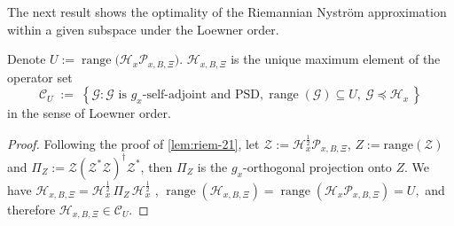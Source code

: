 \documentclass[final,onefignum,onetabnum]{siamart250211}
\begin{document}
    

The next result shows the optimality of the Riemannian Nystr\"om approximation within a given subspace under the Loewner order.
  \begin{proposition}
    \label{prop:nystrom-loewner-opt}
    Denote ${U}:=\operatorname{range}\!\big(\mathcal{H}_x\mathcal{P}_{x, B, \Xi}\big)$. $\mathcal{H}_{x, B, \Xi}$ is the unique maximum element of the operator set
    \[
    \mathcal{C}_{U} \;:=\; \left\{\mathcal{G}:\mathcal{G} \text{ is $g_x$-self-adjoint and PSD}, \operatorname{range}(\mathcal{G})\subseteq U,\ \mathcal{G}\preceq \mathcal{H}_x\,\right\}
    \]
    in the sense of Loewner order.
    \end{proposition}
    
\begin{proof}
  Following the proof of \cref{lem:riem-21},
  let $\mathcal{Z}:=\mathcal{H}_x^{\frac12}\mathcal P_{x,B,\Xi}$, $Z := \mathrm{range}(\mathcal{Z})$ and $\Pi_Z:=\mathcal{Z}(\mathcal{Z}^{*}\mathcal{Z})^{\dagger}\mathcal{Z}^{*}$, then $\Pi_Z$ is the $g_x$-orthogonal projection onto $Z$.
  We have
$\mathcal{H}_{x,B,\Xi}=\mathcal{H}_x^{\frac12}\,\Pi_Z\,\mathcal{H}_x^{\frac12}
$  , $\operatorname{range}(\mathcal{H}_{x,B,\Xi})=\operatorname{range}(\mathcal{H}_x\mathcal P_{x,B,\Xi})=U,
  $
  and therefore $\mathcal{H}_{x,B,\Xi}\in\mathcal C_U$.


\end{proof}
\end{document}
